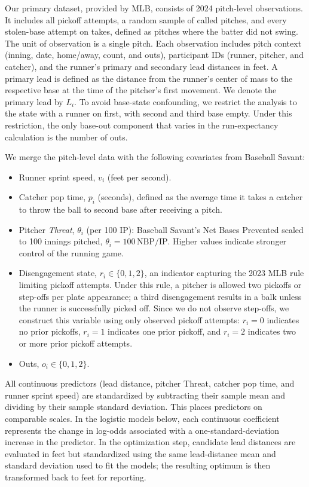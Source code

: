\documentclass[12pt,letterpaper]{article}
\begin{document}
Our primary dataset, provided by MLB, consists of 2024 pitch-level observations. It includes all pickoff attempts, a random sample of called pitches, and every stolen-base attempt on takes, defined as pitches where the batter did not swing. The unit of observation is a single pitch. Each observation includes pitch context (inning, date, home/away, count, and outs), participant IDs (runner, pitcher, and catcher), and the runner's primary and secondary lead distances in feet. A primary lead is defined as the distance from the runner's center of mass to the respective base at the time of the pitcher's first movement. We denote the primary lead by $L_i$. To avoid base-state confounding, we restrict the analysis to the state with a runner on first, with second and third base empty. Under this restriction, the only base-out component that varies in the run-expectancy calculation is the number of outs.

We merge the pitch-level data with the following covariates from Baseball Savant:
\begin{itemize}
    \item Runner sprint speed, $v_i$ (feet per second).
    \item Catcher pop time, $p_i$ (seconds), defined as the average time it takes a catcher to throw the ball to second base after receiving a pitch.
    \item Pitcher \emph{Threat}, $\theta_i$ (per 100 IP): Baseball Savant's Net Bases Prevented \citep{BaseballSavantRunValueND} scaled to 100 innings pitched, $\theta_i = 100\,\mathrm{NBP}/\mathrm{IP}$. Higher values indicate stronger control of the running game.
    \item Disengagement state, $r_i \in \{0,1,2\}$, an indicator capturing the 2023 MLB rule limiting pickoff attempts. Under this rule, a pitcher is allowed two pickoffs or step-offs per plate appearance; a third disengagement results in a balk unless the runner is successfully picked off. Since we do not observe step-offs, we construct this variable using only observed pickoff attempts: $r_i=0$ indicates no prior pickoffs, $r_i=1$ indicates one prior pickoff, and $r_i=2$ indicates two or more prior pickoff attempts.
    \item Outs, $o_i \in \{0,1,2\}$.
\end{itemize}

All continuous predictors (lead distance, pitcher Threat, catcher pop time, and runner sprint speed) are standardized by subtracting their sample mean and dividing by their sample standard deviation. This places predictors on comparable scales. In the logistic models below, each continuous coefficient represents the change in log-odds associated with a one-standard-deviation increase in the predictor. In the optimization step, candidate lead distances are evaluated in feet but standardized using the same lead-distance mean and standard deviation used to fit the models; the resulting optimum is then transformed back to feet for reporting.
\end{document}
